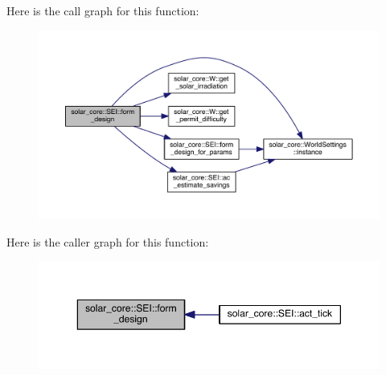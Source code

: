 Here is the call graph for this function\+:
\nopagebreak
\begin{figure}[H]
\begin{center}
\leavevmode
\includegraphics[width=350pt]{classsolar__core_1_1_s_e_i_a807561ad055ddc0df91b80ba406ee6df_cgraph}
\end{center}
\end{figure}




Here is the caller graph for this function\+:\nopagebreak
\begin{figure}[H]
\begin{center}
\leavevmode
\includegraphics[width=350pt]{classsolar__core_1_1_s_e_i_a807561ad055ddc0df91b80ba406ee6df_icgraph}
\end{center}
\end{figure}


\hypertarget{classsolar__core_1_1_s_e_i_a0019e2ad3504adcb5a44e5002f1d0002}{}
